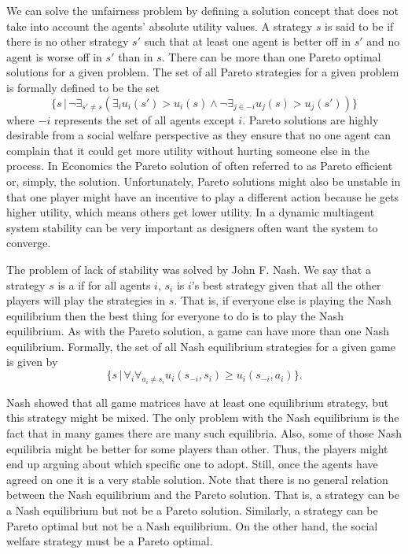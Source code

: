 We can solve the unfairness problem by defining a solution concept
that does not take into account the agents' absolute utility values.
 A strategy
$s$ is said to be  if there is no other strategy
$s'$ such that at least one agent is better off in $s'$ and no agent
is worse off in $s'$ than in $s$. There can be more than one Pareto
optimal solutions for a given problem. The set of all Pareto
strategies for a given problem is formally defined to be the set
\begin{equation}
  \label{eq:pareto-soln}
\{s \,|\, \neg \exists_{s' \neq s} (\exists_{i} u_i(s') >
    u_i(s) \wedge \neg \exists_{j \in {-i}} u_j(s) > u_j(s'))\}
\end{equation}
where $-i$ represents the set of all agents except $i$. Pareto
solutions are highly desirable from a social welfare perspective as
they ensure that no one agent can complain that it could get more
utility without hurting someone else in the process. In Economics the
Pareto solution of often referred to as Pareto efficient or, simply,
the  solution. Unfortunately, Pareto solutions might
also be unstable in that one player might have an incentive to play a
different action because he gets higher utility, which means others
get lower utility. In a dynamic multiagent system stability can be
very important as designers often want the system to converge.

The problem of lack of stability was solved by John F. Nash. We say
that a strategy $s$ is a  if for all agents $i$,
$s_i$ is $i$'s best strategy given that all the other players will
play the strategies in $s$. That is, if everyone else is playing the
Nash equilibrium then the best thing for everyone to do is to play the
Nash equilibrium. As with the Pareto solution, a game can have more
than one Nash equilibrium. Formally, the set of all Nash equilibrium
strategies for a given game is given by
\begin{equation}
  \label{eq:nash-eq}
    \{s \,|\, \forall_{i} \forall_{a_i \neq s_i} u_i(s_{-i}, s_i) \geq
    u_i(s_{-i}, a_i) \}.
\end{equation}

Nash showed that all game matrices have at least one equilibrium
strategy, but this strategy might be mixed. The only problem with the
Nash equilibrium is the fact that in many games there are many such
equilibria. Also, some of those Nash equilibria might be better for
some players than other. Thus, the players might end up arguing about
which specific one to adopt. Still, once the agents have agreed on one
it is a very stable solution. Note that there is no general relation
between the Nash equilibrium and the Pareto solution. That is, a
strategy can be a Nash equilibrium but not be a Pareto solution.
Similarly, a strategy can be Pareto optimal but not be a Nash
equilibrium. On the other hand, the social welfare strategy must be a
Pareto optimal.

